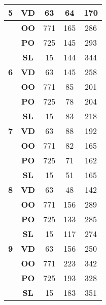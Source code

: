 \begin{table}
\begin{tabular}{|c|c|c|c|c|}
\multirow{-4}{*}{\textbf{5}} & \textbf{VD} & 63 & \cellcolor[HTML]{C0C0C0}64 & \cellcolor[HTML]{C0C0C0}170 \\ \hline
 & \textbf{OO} & 771 & 165 & \cellcolor[HTML]{C0C0C0}286 \\ \cline{2-5} 
 & \textbf{PO} & 725 & \cellcolor[HTML]{C0C0C0}145 & \cellcolor[HTML]{C0C0C0}293 \\ \cline{2-5} 
 & \textbf{SL} & 15 & \cellcolor[HTML]{C0C0C0}144 & \cellcolor[HTML]{C0C0C0}344 \\ \cline{2-5} 
\multirow{-4}{*}{\textbf{6}} & \textbf{VD} & 63 & \cellcolor[HTML]{C0C0C0}145 & \cellcolor[HTML]{C0C0C0}258 \\ \hline
 & \textbf{OO} & 771 & \cellcolor[HTML]{C0C0C0}85 & \cellcolor[HTML]{C0C0C0}201 \\ \cline{2-5} 
 & \textbf{PO} & 725 & \cellcolor[HTML]{C0C0C0}78 & \cellcolor[HTML]{C0C0C0}204 \\ \cline{2-5} 
 & \textbf{SL} & 15 & \cellcolor[HTML]{C0C0C0}83 & \cellcolor[HTML]{C0C0C0}218 \\ \cline{2-5} 
\multirow{-4}{*}{\textbf{7}} & \textbf{VD} & 63 & \cellcolor[HTML]{C0C0C0}88 & \cellcolor[HTML]{C0C0C0}192 \\ \hline
 & \textbf{OO} & 771 & 82 & \cellcolor[HTML]{C0C0C0}165 \\ \cline{2-5} 
 & \textbf{PO} & 725 & \cellcolor[HTML]{C0C0C0}71 & \cellcolor[HTML]{C0C0C0}162 \\ \cline{2-5} 
 & \textbf{SL} & 15 & \cellcolor[HTML]{C0C0C0}51 & \cellcolor[HTML]{C0C0C0}165 \\ \cline{2-5} 
\multirow{-4}{*}{\textbf{8}} & \textbf{VD} & 63 & \cellcolor[HTML]{C0C0C0}48 & \cellcolor[HTML]{C0C0C0}142 \\ \hline
 & \textbf{OO} & 771 & 156 & \cellcolor[HTML]{C0C0C0}289 \\ \cline{2-5} 
 & \textbf{PO} & 725 & \cellcolor[HTML]{C0C0C0}133 & \cellcolor[HTML]{C0C0C0}285 \\ \cline{2-5} 
 & \textbf{SL} & 15 & \cellcolor[HTML]{C0C0C0}117 & \cellcolor[HTML]{C0C0C0}274 \\ \cline{2-5} 
\multirow{-4}{*}{\textbf{9}} & \textbf{VD} & 63 & 156 & \cellcolor[HTML]{C0C0C0}250 \\ \hline
 & \textbf{OO} & 771 & 223 & \cellcolor[HTML]{C0C0C0}342 \\ \cline{2-5} 
 & \textbf{PO} & 725 & \cellcolor[HTML]{C0C0C0}193 & \cellcolor[HTML]{C0C0C0}328 \\ \cline{2-5} 
 & \textbf{SL} & 15 & \cellcolor[HTML]{C0C0C0}183 & \cellcolor[HTML]{C0C0C0}351 \\ \cline{2-5} 

\end{tabular}
\end{table}

